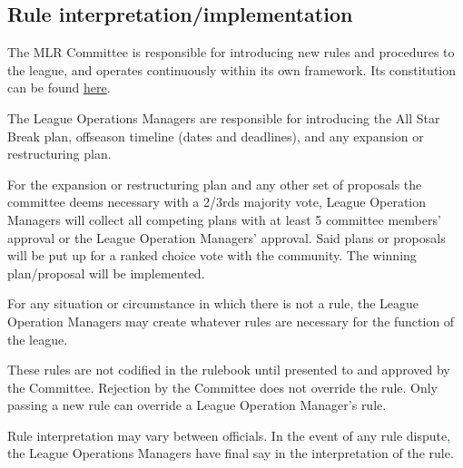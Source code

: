 \subsection{Rule interpretation/implementation}
\begin{deepEnumerate}
	\item The MLR Committee is responsible for introducing new rules and procedures to the league, and operates continuously within its own framework.
	Its constitution can be found \hyperref[sec:Committee Constitution]{here}.
	\item The League Operations Managers are responsible for introducing the All Star Break plan, offseason timeline (dates and deadlines), and any expansion or restructuring plan.
	\begin{deepEnumerate}
		\item For the expansion or restructuring plan and any other set of proposals the committee deems necessary with a 2/3rds majority vote, League Operation Managers
		will collect all competing plans with at least 5 committee members' approval or the League Operation Managers' approval.
		Said plans or proposals will be put up for a ranked choice vote with the community. The winning plan/proposal will be implemented.
	\end{deepEnumerate}
	\item For any situation or circumstance in which there is not a rule, the League Operation Managers may create whatever rules are necessary
	for the function of the league.
	\begin{deepEnumerate}
		\item These rules are not codified in the rulebook until presented to and approved by the Committee.
		Rejection by the Committee does not override the rule. Only passing a new rule can override a League Operation Manager's rule.
	\end{deepEnumerate}
	\item Rule interpretation may vary between officials. In the event of any rule dispute, the League Operations Managers have final say in the interpretation of the rule.
\end{deepEnumerate}

